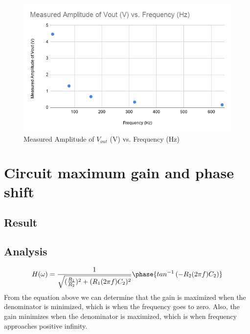 \documentclass{article}
\begin{document}
\begin{figure}[H]
    \centering
        \includegraphics[scale=0.45]{ECE2101L_Lab11_B1_plot3.png}
        \caption{Measured Amplitude of $V_{out}$ (V) vs. Frequency (Hz)}
\end{figure}

\newpage

\section{Circuit maximum gain and phase shift}

\subsection*{Result}
\begin{table}[H]
\end{table}

\subsection*{Analysis}
$$H(\omega)=\frac{1}{\sqrt{(\frac{R_1}{R_2})^2+(R_1(2\pi f)C_2)^2}}\phase{tan^{-1}\left(-R_2(2\pi f) C_2\right)}$$
From the equation above we can determine that the gain is maximized when the denominator is minimized, which is when the frequency goes to zero. Also, the gain minimizes when the denominator is maximized, which is when frequency approaches positive infinity. 
\end{document}
